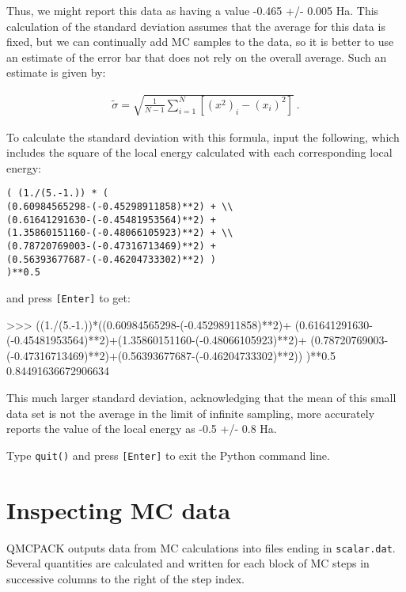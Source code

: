 Thus, we might report this data as having a value -0.465 +/- 0.005 Ha.
This calculation of the standard deviation assumes that the average for this
data is fixed, but we can continually add MC samples to the data, so it
is better to use an estimate of the error bar that does not rely on the overall
average.  Such an estimate is given by:

\begin{align}
  \tilde{\sigma} = \sqrt{\frac{1}{N-1}\sum_{i=1}^{N} \left[{(x^2)}_i - ({x_i})^2\right]}\:.
\end{align}

To calculate the standard deviation with this formula, input the following,
which includes the square of the local energy calculated with each
corresponding local energy:

\begin{lstlisting}[style=SHELL]
( (1./(5.-1.)) * ( 
(0.60984565298-(-0.45298911858)**2) + \\
(0.61641291630-(-0.45481953564)**2) + 
(1.35860151160-(-0.48066105923)**2) + \\
(0.78720769003-(-0.47316713469)**2) + 
(0.56393677687-(-0.46204733302)**2) ) 
)**0.5
\end{lstlisting}

and press \texttt{[Enter]} to get:

\begin{shade}
>>> ((1./(5.-1.))*((0.60984565298-(-0.45298911858)**2)+ 
(0.61641291630-(-0.45481953564)**2)+(1.35860151160-(-0.48066105923)**2)+ 
(0.78720769003-(-0.47316713469)**2)+(0.56393677687-(-0.46204733302)**2))
)**0.5
0.84491636672906634
\end{shade}

This much larger standard deviation, acknowledging that the mean of this small
data set is not the average in the limit of infinite sampling, more accurately
reports the value of the local energy as -0.5 +/- 0.8 Ha.

Type \texttt{quit()} and press \texttt{[Enter]} to exit the Python command line.

\section{Inspecting MC data}
\label{sec:inspect_data} 

QMCPACK outputs data from MC calculations into files ending in \texttt{scalar.dat}.
Several quantities are calculated and written for each block of MC
steps in successive columns to the right of the step index. 

